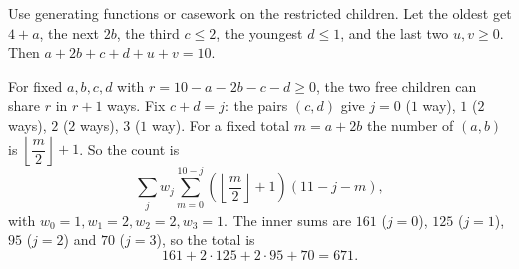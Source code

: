 Use generating functions or casework on the restricted children. Let the oldest get $4+a$, the next $2b$, the third $c\le2$, the youngest $d\le1$, and the last two $u,v\ge0$. Then $a+2b+c+d+u+v=10$.

For fixed $a,b,c,d$ with $r=10-a-2b-c-d\ge0$, the two free children can share $r$ in $r+1$ ways. Fix $c+d=j$: the pairs $(c,d)$ give $j=0$ ($1$ way), $1$ ($2$ ways), $2$ ($2$ ways), $3$ ($1$ way). For a fixed total $m=a+2b$ the number of $(a,b)$ is $\left\lfloor\dfrac {m}{2}\right\rfloor+1$. So the count is
\[
\sum_{j}w_j\sum_{m=0}^{10-j}\left(\left\lfloor\dfrac {m}{2}\right\rfloor+1\right)(11-j-m),
\]
with $w_0=1,w_1=2,w_2=2,w_3=1$. The inner sums are $161$ ($j=0$), $125$ ($j=1$), $95$ ($j=2$) and $70$ ($j=3$), so the total is
\[
161+2\cdot125+2\cdot95+70=\boxed{671}.
\]
